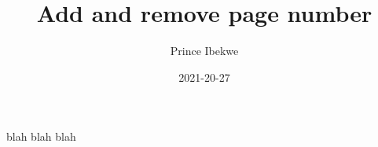 \documentclass{article}
\title{Add and remove page number}
\date{2021-20-27}
\author{Prince Ibekwe}
\begin{document}
	\maketitle
	\newpage
	
	blah blah blah
\end{document}
